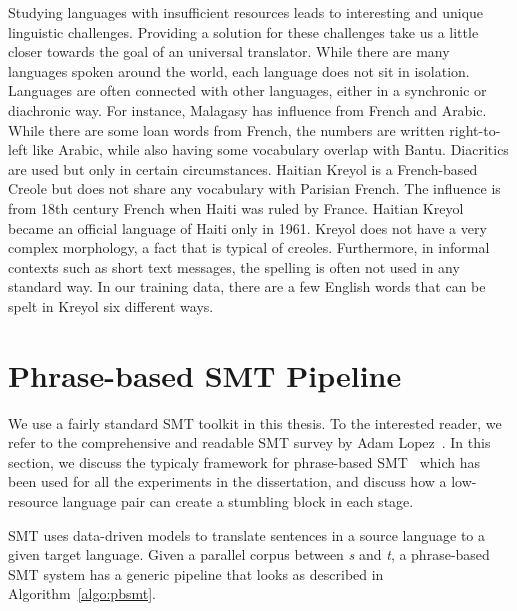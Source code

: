 Studying languages with insufficient resources leads to interesting and unique linguistic challenges.  Providing a solution for these challenges take us a little closer towards the goal of an universal translator. While there are many languages spoken around the world, each language does not sit in isolation. Languages are often connected with other languages, either in a synchronic or diachronic way. For instance, Malagasy has influence from French and Arabic. While there are some loan words from French, the numbers are written right-to-left like Arabic, while also having some vocabulary overlap with Bantu. Diacritics are used but only in certain circumstances. Haitian Kreyol is a French-based Creole but does not share any vocabulary with Parisian French. The influence is from 18th century French when Haiti was ruled by France. Haitian Kreyol became an official language of Haiti only in 1961. Kreyol does not have a very complex morphology, a fact that is typical of creoles. Furthermore, in informal contexts such as short text messages, the spelling is often not used in any standard way. In our training data, there are a few English words that can be spelt in Kreyol six different ways.

\section{Phrase-based SMT Pipeline}
\label{sec:generic_pipelin}
We use a fairly standard SMT toolkit in this thesis. To the interested reader, we refer to the comprehensive and readable SMT survey by Adam Lopez~\cite{Lopez07asurvey}. In this section, we discuss the typicaly framework for phrase-based SMT~\cite{Koehn:03} which has been used for all the experiments in the dissertation, and discuss how a low-resource language pair can create a stumbling block in each stage. 

SMT uses data-driven models to translate sentences in a source language to a given target language. Given a parallel corpus between \emph{s} and \emph{t}, a phrase-based SMT system has a generic pipeline that looks as described in Algorithm~\ref{algo:pbsmt}. 



